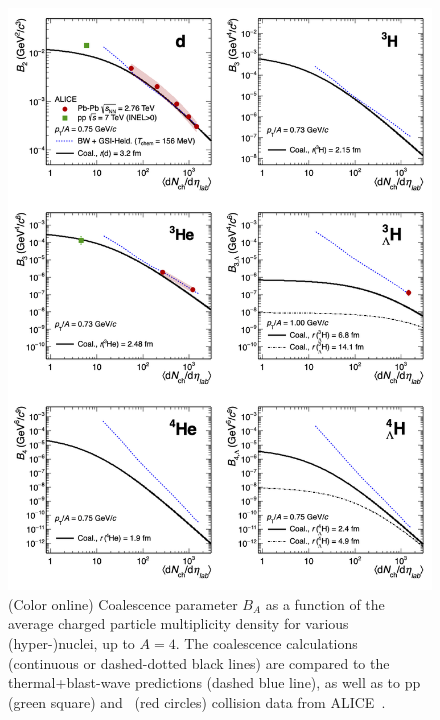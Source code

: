 \documentclass{appolb}
\begin{document}
\begin{figure}[htb]
\begin{center}
\includegraphics[width=\textwidth]{coal2Thermal2alice.png}
\caption{(Color online) Coalescence parameter $B_A$ as a function of the average charged particle multiplicity density for various (hyper-)nuclei, up to $A = 4$. The coalescence calculations (continuous or dashed-dotted black lines) are compared to the thermal+blast-wave predictions (dashed blue line), as well as to pp (green square) and \PbPb~(red circles) collision data from ALICE~\cite{ALICE:nucleipp2017,ALICE:deuteronppPbPb2015,Adam:2015yta}. }
\label{Fig:comparison}
\end{center}
\end{figure} 

\newpage
 	

\end{document}
